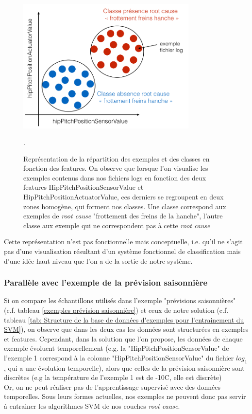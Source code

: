 \begin{figure}[h]
	\centering\includegraphics[width=9cm]{images/classes_log.png}
	\caption[Représentation de la répartition des exemples et des classes en fonction des features]{Représentation de la répartition des exemples et des classes en fonction des features. On observe que lorsque l'on visualise les exemples contenus dans nos fichiers logs en fonction des deux features HipPitchPositionSensorValue et HipPitchPositionActuatorValue, ces derniers se regroupent en deux zones homogène, qui forment nos classes. Une classe correspond aux exemples de \emph{root cause} "frottement des freins de la hanche", l'autre classe aux exemple qui ne correspondent pas à cette \emph{root cause}}.
	\label{fig:Représentation de la répartition des exemples et des classes en fonction des features}
\end{figure}

Cette représentation n'est pas fonctionnelle mais conceptuelle, i.e. qu'il ne s'agit pas d'une visualisation résultant d'un système fonctionnel de classification mais d'une idée haut niveau que l'on a de la sortie de notre système. 


\subsubsection{Parallèle avec l'exemple de la prévision saisonnière}
\label{Automatisation du processus d'investigation: Achitecture High Level du système proposé: Les exemples: Parallèle avec l'exemple de la prévision saisonnière}
Si on compare les échantillons utilisés dans l'exemple "prévisions saisonnières" (c.f. tableau \ref{exemples prévision saisonnière}) et ceux de notre solution (c.f. tableau \ref {tab: Structure de la base de données d'exemples pour l'entrainement du SVM}), on observe que dans les deux cas les données sont structurées en exemples et features. Cependant, dans la solution que l'on propose, les données de chaque exemple évoluent temporellement (e.g. la "HipPitchPositionSensorValue" de l'exemple 1 correspond à la colonne "HipPitchPositionSensorValue" du fichier $log_1$, qui a une évolution temporelle), alors que celles de la prévision saisonnière sont discrètes (e.g la température de l'exemple 1 est de -10\degres C, elle est discrète) \\
Or, on ne peut réaliser pas de l'apprentissage supervisé avec des données temporelles. Sous leurs formes actuelles, nos exemples ne peuvent donc pas servir à entrainer les algorithmes SVM de nos couches \emph{ root cause}.


